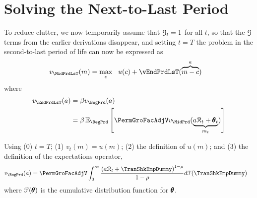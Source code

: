 \documentclass[titlepage, headings=optiontotocandhead]{Resources/texmf-local/tex/latex/econtex}
\begin{document}
\hypertarget{solving-the-next-to-last-period}{}
\hypertarget{solving-the-next}{}
\section{Solving the Next-to-Last Period}\label{sec:solving-the-next}

To reduce clutter, we now temporarily assume that $\mathcal{G}_{t}=1$ for all $t$, so that the $\mathcal{G}$ terms from the earlier derivations disappear, and setting $t=T$ the problem in the second-to-last period of life can now be expressed as
\begin{equation}\begin{gathered}\begin{aligned}
  v_{\MidPrdLsT}(m)  & = \max_{c} ~~ u(c) +
                              \vEndPrdLsT(\overbrace{m-c}^{a})
                              \label{eq:vEndTm1}
\end{aligned}\end{gathered}\end{equation}
where 
\begin{equation*}\begin{gathered}\begin{aligned}
  v_{\EndPrdLsT}(a)  & = \beta v_{\BegPrd}(a) 
\\                          & = \beta \Ex_{\BegPrd} \left[\PermGroFacAdjV v_{\MidPrd}(\underbrace{a \RNrm_{t} + \TranShkEmp_{t}}_{{m}_{t}})\right]
    \end{aligned}\end{gathered}\end{equation*}



Using (0) $t=T$; (1) $v_{t}(m)=u(m)$; (2) the definition of $u(m)$; and (3) the definition of the expectations operator,  %
\begin{equation}\begin{gathered}\begin{aligned}
      v_{\BegPrd}(a)   & = \PermGroFacAdjV\int_{0}^{\infty} \frac{\left(a \RNrm_{t}+ \TranShkEmpDummy\right)^{1-\rho}}{1-\rho}  d\FDist(\TranShkEmpDummy) \label{eq:NumDefInt}
    \end{aligned}\end{gathered}\end{equation}
where $\mathcal{F}(\pmb{\theta})$ is the cumulative distribution function for ${\pmb{\theta}}$.
\end{document}
